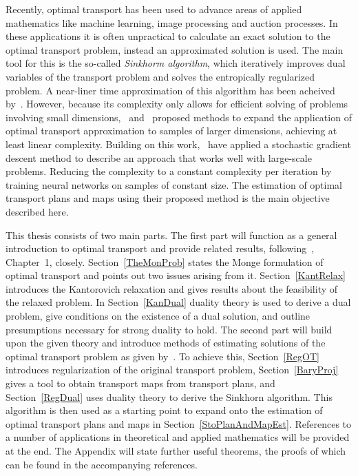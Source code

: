 Recently, optimal transport has been used to advance areas of applied mathematics like machine learning, image processing and auction processes. In these applications it is often unpractical to calculate an exact solution to the optimal transport problem, instead an approximated solution is used. The main tool for this is the so-called \textit{Sinkhorm algorithm}, which iteratively improves dual variables of the transport problem and solves the entropically regularized problem. A near-liner time approximation of this algorithm has been acheived by\ \cite{Alts2019}. However, because its complexity only allows for efficient solving of problems involving small dimensions,\ \cite{Gene2016} and\ \cite{Arjo2017} proposed methods to expand the application of optimal transport approximation to samples of larger dimensions, achieving at least linear complexity. Building on this work,\ \cite{Seg2018} have applied a stochastic gradient descent method to describe an approach that works well with large-scale problems. Reducing the complexity to a constant complexity per iteration by training neural networks on samples of constant size. The estimation of optimal transport plans and maps using their proposed method is the main objective described here.

This thesis consists of two main parts. The first part will function as a general introduction to optimal transport and provide related results, following\ \cite{San2015}, Chapter~1, closely. Section~\ref{TheMonProb} states the Monge formulation of optimal transport and points out two issues arising from it. Section~\ref{KantRelax} introduces the Kantorovich relaxation and gives results about the feasibility of the relaxed problem. In Section~\ref{KanDual} duality theory is used to derive a dual problem, give conditions on the existence of a dual solution, and outline presumptions necessary for strong duality to hold. The second part will build upon the given theory and introduce methods of estimating solutions of the optimal transport problem as given by\ \cite{Seg2018}. To achieve this, Section~\ref{RegOT} introduces regularization of the original transport problem, Section~\ref{BaryProj} gives a tool to obtain transport maps from transport plans, and Section~\ref{RegDual} uses duality theory to derive the Sinkhorn algorithm. This algorithm is then used as a starting point to expand onto the estimation of optimal transport plans and maps in Section~\ref{StoPlanAndMapEst}. References to a number of applications in theoretical and applied mathematics will be provided at the end. The Appendix will state further useful theorems, the proofs of which can be found in the accompanying references.